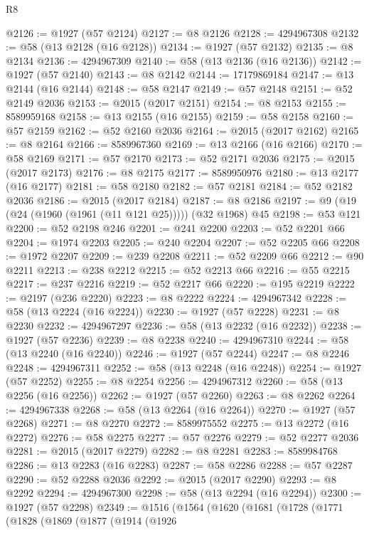 \begin{lexlean}{R8}
\begin{coremodule}
@2126 := @1927 (@57 @2124)
@2127 := @8 @2126
@2128 := 4294967308
@2132 := @58 (@13 @2128 (@16 @2128))
@2134 := @1927 (@57 @2132)
@2135 := @8 @2134
@2136 := 4294967309
@2140 := @58 (@13 @2136 (@16 @2136))
@2142 := @1927 (@57 @2140)
@2143 := @8 @2142
@2144 := 17179869184
@2147 := @13 @2144 (@16 @2144)
@2148 := @58 @2147
@2149 := @57 @2148
@2151 := @52 @2149 @2036
@2153 := @2015 (@2017 @2151)
@2154 := @8 @2153
@2155 := 8589959168
@2158 := @13 @2155 (@16 @2155)
@2159 := @58 @2158
@2160 := @57 @2159
@2162 := @52 @2160 @2036
@2164 := @2015 (@2017 @2162)
@2165 := @8 @2164
@2166 := 8589967360
@2169 := @13 @2166 (@16 @2166)
@2170 := @58 @2169
@2171 := @57 @2170
@2173 := @52 @2171 @2036
@2175 := @2015 (@2017 @2173)
@2176 := @8 @2175
@2177 := 8589950976
@2180 := @13 @2177 (@16 @2177)
@2181 := @58 @2180
@2182 := @57 @2181
@2184 := @52 @2182 @2036
@2186 := @2015 (@2017 @2184)
@2187 := @8 @2186
@2197 := @9 (@19 (@24 (@1960 (@1961 (@11 @121 @25))))) (@32 @1968) @45
@2198 := @53 @121
@2200 := @52 @2198 @246
@2201 := @241 @2200
@2203 := @52 @2201 @66
@2204 := @1974 @2203
@2205 := @240 @2204
@2207 := @52 @2205 @66
@2208 := @1972 @2207
@2209 := @239 @2208
@2211 := @52 @2209 @66
@2212 := @90 @2211
@2213 := @238 @2212
@2215 := @52 @2213 @66
@2216 := @55 @2215
@2217 := @237 @2216
@2219 := @52 @2217 @66
@2220 := @195 @2219
@2222 := @2197 (@236 @2220)
@2223 := @8 @2222
@2224 := 4294967342
@2228 := @58 (@13 @2224 (@16 @2224))
@2230 := @1927 (@57 @2228)
@2231 := @8 @2230
@2232 := 4294967297
@2236 := @58 (@13 @2232 (@16 @2232))
@2238 := @1927 (@57 @2236)
@2239 := @8 @2238
@2240 := 4294967310
@2244 := @58 (@13 @2240 (@16 @2240))
@2246 := @1927 (@57 @2244)
@2247 := @8 @2246
@2248 := 4294967311
@2252 := @58 (@13 @2248 (@16 @2248))
@2254 := @1927 (@57 @2252)
@2255 := @8 @2254
@2256 := 4294967312
@2260 := @58 (@13 @2256 (@16 @2256))
@2262 := @1927 (@57 @2260)
@2263 := @8 @2262
@2264 := 4294967338
@2268 := @58 (@13 @2264 (@16 @2264))
@2270 := @1927 (@57 @2268)
@2271 := @8 @2270
@2272 := 8589975552
@2275 := @13 @2272 (@16 @2272)
@2276 := @58 @2275
@2277 := @57 @2276
@2279 := @52 @2277 @2036
@2281 := @2015 (@2017 @2279)
@2282 := @8 @2281
@2283 := 8589984768
@2286 := @13 @2283 (@16 @2283)
@2287 := @58 @2286
@2288 := @57 @2287
@2290 := @52 @2288 @2036
@2292 := @2015 (@2017 @2290)
@2293 := @8 @2292
@2294 := 4294967300
@2298 := @58 (@13 @2294 (@16 @2294))
@2300 := @1927 (@57 @2298)
@2349 := @1516
    (@1564
      (@1620
        (@1681
          (@1728
            (@1771
              (@1828
                (@1869
                  (@1877
                    (@1914
                      (@1926

\end{coremodule}
\end{lexlean}
